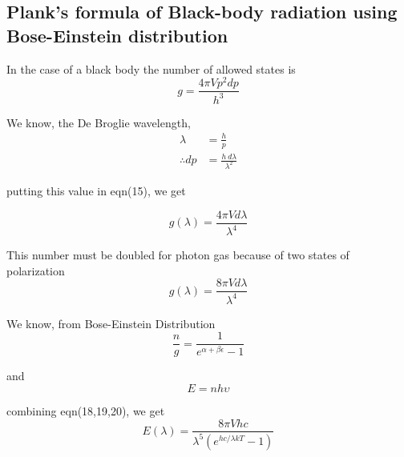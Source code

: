 \documentclass[12pt, letterpaper]{article}
\begin{document}
    \subsection*{Plank's formula of Black-body radiation using Bose-Einstein distribution}

    In the case of a black body the number of allowed states is 
    \begin{equation}
        g = \frac{4 \pi V p^{2} dp}{h^{3}}
    \end{equation}

    We know, the De Broglie wavelength, 
    \begin{equation}
        \begin{split}
             \lambda &= \frac{h}{p} \\ 
             \therefore dp &= \frac{h \  d\lambda}{\lambda ^{2}}
        \end{split}
    \end{equation}

    putting this value in eqn(15), we get

    \begin{equation}
        g(\lambda) = \frac{4 \pi V d\lambda}{\lambda ^{4}}
    \end{equation}

    This number must be doubled for photon gas because of two states of polarization
    \begin{equation}
        g(\lambda) = \frac{8 \pi V d\lambda}{\lambda ^{4}}
    \end{equation}

    We know, from Bose-Einstein Distribution 
    \begin{equation}
        \frac{n}{g} = \frac{1}{e^{\alpha + \beta \epsilon} - 1}  
    \end{equation}

    and 
    \begin{equation}
        E = nh\upsilon 
    \end{equation}

    combining eqn(18,19,20), we get 
    \begin{equation}
        E(\lambda) = \frac{8 \pi V hc}{\lambda ^{5} (e^{hc/\lambda kT}-1)} 
    \end{equation}
\end{document}
